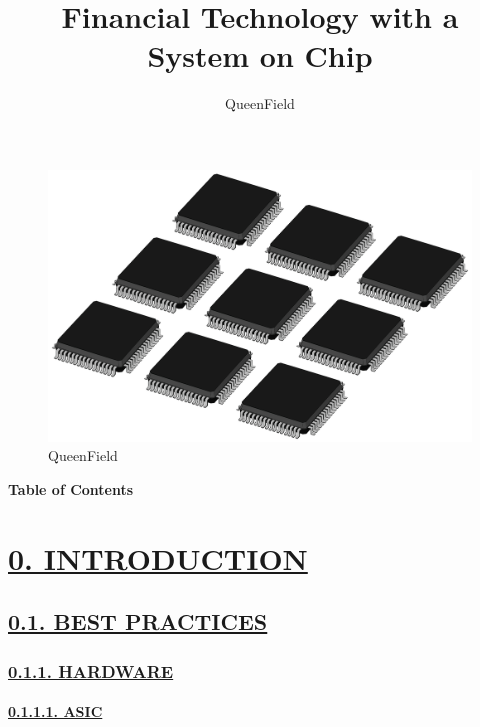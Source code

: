\documentclass[
]{article}
\title{Financial Technology with a System on Chip}
\author{QueenField}
\date{}
\begin{document}
\maketitle

\begin{figure}
\centering
\includegraphics{../icon.jpg}
\caption{QueenField}
\end{figure}

\textbf{Table of Contents}

\hypertarget{introduction}{%
\section{\texorpdfstring{\protect\hyperlink{introduction-1}{0.
INTRODUCTION}}{0. INTRODUCTION}}\label{introduction}}

\hypertarget{best-practices}{%
\subsection{\texorpdfstring{\protect\hyperlink{best-practices-1}{0.1.
BEST PRACTICES}}{0.1. BEST PRACTICES}}\label{best-practices}}

\hypertarget{hardware}{%
\subsubsection{\texorpdfstring{\protect\hyperlink{hardware-1}{0.1.1.
HARDWARE}}{0.1.1. HARDWARE}}\label{hardware}}

\hypertarget{asic}{%
\paragraph{\texorpdfstring{\protect\hyperlink{asic-1}{0.1.1.1.
ASIC}}{0.1.1.1. ASIC}}\label{asic}}
\end{document}
